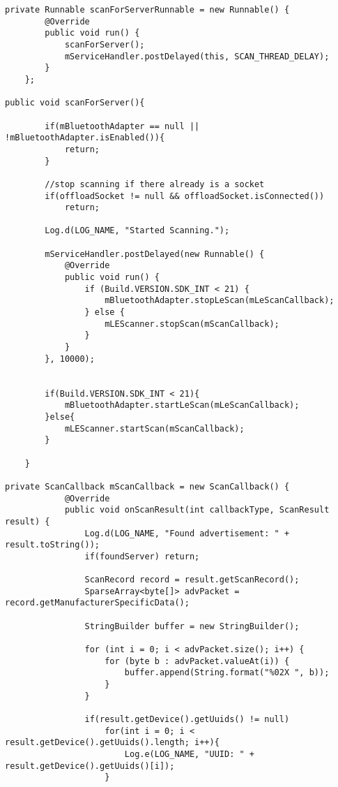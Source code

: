 \lstset{language=java,caption=The ScanForServerRunnable and its callbacks,label=lst:scanserver}
\begin{lstlisting}
private Runnable scanForServerRunnable = new Runnable() {
        @Override
        public void run() {
            scanForServer();
            mServiceHandler.postDelayed(this, SCAN_THREAD_DELAY);
        }
    };
    
public void scanForServer(){

        if(mBluetoothAdapter == null || !mBluetoothAdapter.isEnabled()){
            return;
        }

        //stop scanning if there already is a socket
        if(offloadSocket != null && offloadSocket.isConnected())
            return;

        Log.d(LOG_NAME, "Started Scanning.");

        mServiceHandler.postDelayed(new Runnable() {
            @Override
            public void run() {
                if (Build.VERSION.SDK_INT < 21) {
                    mBluetoothAdapter.stopLeScan(mLeScanCallback);
                } else {
                    mLEScanner.stopScan(mScanCallback);
                }
            }
        }, 10000);


        if(Build.VERSION.SDK_INT < 21){
            mBluetoothAdapter.startLeScan(mLeScanCallback);
        }else{
            mLEScanner.startScan(mScanCallback);
        }

    }

private ScanCallback mScanCallback = new ScanCallback() {
            @Override
            public void onScanResult(int callbackType, ScanResult result) {
                Log.d(LOG_NAME, "Found advertisement: " + result.toString());
                if(foundServer) return;

                ScanRecord record = result.getScanRecord();
                SparseArray<byte[]> advPacket = record.getManufacturerSpecificData();

                StringBuilder buffer = new StringBuilder();

                for (int i = 0; i < advPacket.size(); i++) {
                    for (byte b : advPacket.valueAt(i)) {
                        buffer.append(String.format("%02X ", b));
                    }
                }

                if(result.getDevice().getUuids() != null)
                    for(int i = 0; i < result.getDevice().getUuids().length; i++){
                        Log.e(LOG_NAME, "UUID: " + result.getDevice().getUuids()[i]);
                    }


\end{lstlisting}
